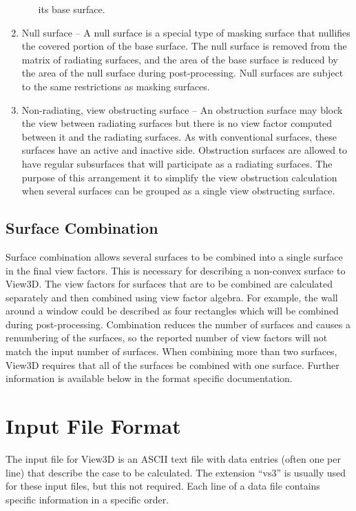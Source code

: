 \documentclass[10pt]{article}
\begin{document}
\begin{enumerate}
\begin{enumerate}
   its base surface.
\end{enumerate}
\item Null surface – A null surface is a special type of masking surface that
nullifies the covered portion of the base surface. The null surface is removed
from the matrix of radiating surfaces, and the area of the base surface is
reduced by the area of the null surface during post-processing.  Null surfaces
are subject to the same restrictions as masking surfaces.
\item Non-radiating, view obstructing surface – An obstruction surface may
block the view between radiating surfaces but there is no view factor computed
between it and the radiating surfaces.  As with conventional surfaces, these
surfaces have an active and inactive side.  Obstruction surfaces are allowed to
have regular subsurfaces that will participate as a radiating surfaces.  The
purpose of this arrangement it to simplify the view obstruction calculation
when several surfaces can be grouped as a single view obstructing surface.
\end{enumerate}

\subsection{Surface Combination}
Surface combination allows several surfaces to be combined into a single
surface in the final view factors. This is necessary for describing a
non-convex surface to View3D.  The view factors for surfaces that are to be
combined are calculated separately and then combined using view factor algebra.
For example, the wall around a window could be described as four rectangles
which will be combined during post-processing.  Combination reduces the number
of surfaces and causes a renumbering of the surfaces, so the reported number of
view factors will not match the input number of surfaces.  When combining more
than two surfaces, View3D requires that all of the surfaces be combined with
one surface.  Further information is available below in the format specific
documentation.

\section{Input File Format}
The input file for View3D is an ASCII text file with data entries (often one
per line) that describe the case to be calculated.  The extension ``vs3'' is
usually used for these input files, but this not required.  Each line of a
data file contains specific information in a specific order.
\end{document}
